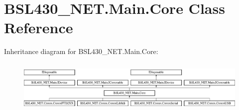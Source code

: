 \hypertarget{class_b_s_l430___n_e_t_1_1_main_1_1_core}{}\section{B\+S\+L430\+\_\+\+N\+E\+T.\+Main.\+Core Class Reference}
\label{class_b_s_l430___n_e_t_1_1_main_1_1_core}
Inheritance diagram for B\+S\+L430\+\_\+\+N\+E\+T.\+Main.\+Core\+:\begin{figure}[H]
\begin{center}
\leavevmode
\includegraphics[height=2.545455cm]{class_b_s_l430___n_e_t_1_1_main_1_1_core}
\end{center}
\end{figure}
